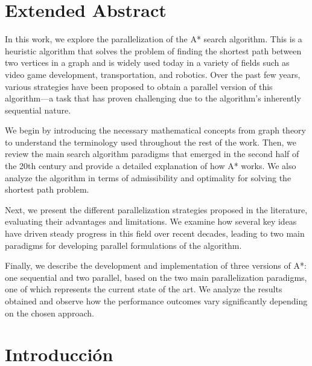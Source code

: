 \documentclass[a4paper,12pt]{article}
\begin{document}
\newpage

\section*{Extended Abstract}
\thispagestyle{empty}

In this work, we explore the parallelization of the A* search algorithm. This is a heuristic algorithm that solves the problem of finding the shortest path between two vertices in a graph and is widely used today in a variety of fields such as video game development, transportation, and robotics. Over the past few years, various strategies have been proposed to obtain a parallel version of this algorithm—a task that has proven challenging due to the algorithm’s inherently sequential nature.

We begin by introducing the necessary mathematical concepts from graph theory to understand the terminology used throughout the rest of the work. Then, we review the main search algorithm paradigms that emerged in the second half of the 20th century and provide a detailed explanation of how A* works. We also analyze the algorithm in terms of admissibility and optimality for solving the shortest path problem.

Next, we present the different parallelization strategies proposed in the literature, evaluating their advantages and limitations. We examine how several key ideas have driven steady progress in this field over recent decades, leading to two main paradigms for developing parallel formulations of the algorithm.

Finally, we describe the development and implementation of three versions of A*: one sequential and two parallel, based on the two main parallelization paradigms, one of which represents the current state of the art. We analyze the results obtained and observe how the performance outcomes vary significantly depending on the chosen approach.

\newpage

\tableofcontents
\thispagestyle{empty}

\newpage

\section{Introducción} \label{sec:introduccion}
\end{document}
